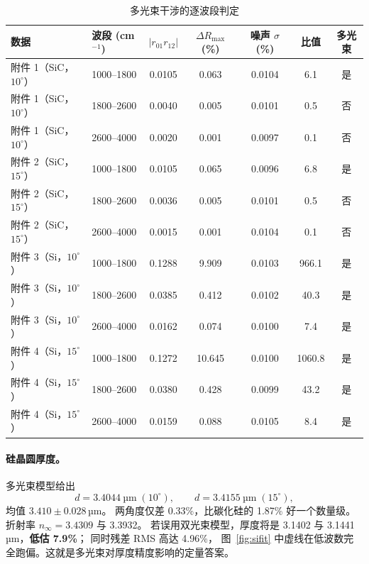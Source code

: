 \documentclass[12pt]{article}
\begin{document}
\begin{table}[!htbp]
  \centering
  \caption{多光束干涉的逐波段判定}\label{tab:diag}
  \begin{tabular}{llccccc}
    \toprule
    数据 & 波段 (cm$^{-1}$) & $|r_{01}r_{12}|$ & $\Delta R_{\max}$ (\%) & 噪声 $\sigma$ (\%) & 比值 & 多光束 \\
    \midrule
    附件 1（SiC，$10^\circ$） & 1000--1800 & 0.0105 & 0.063 & 0.0104 & 6.1 & 是 \\
    附件 1（SiC，$10^\circ$） & 1800--2600 & 0.0040 & 0.005 & 0.0101 & 0.5 & 否 \\
    附件 1（SiC，$10^\circ$） & 2600--4000 & 0.0020 & 0.001 & 0.0097 & 0.1 & 否 \\
    附件 2（SiC，$15^\circ$） & 1000--1800 & 0.0105 & 0.065 & 0.0096 & 6.8 & 是 \\
    附件 2（SiC，$15^\circ$） & 1800--2600 & 0.0036 & 0.005 & 0.0101 & 0.5 & 否 \\
    附件 2（SiC，$15^\circ$） & 2600--4000 & 0.0015 & 0.001 & 0.0104 & 0.1 & 否 \\
    附件 3（Si，$10^\circ$） & 1000--1800 & 0.1288 & 9.909 & 0.0103 & 966.1 & 是 \\
    附件 3（Si，$10^\circ$） & 1800--2600 & 0.0385 & 0.412 & 0.0102 & 40.3 & 是 \\
    附件 3（Si，$10^\circ$） & 2600--4000 & 0.0162 & 0.074 & 0.0100 & 7.4 & 是 \\
    附件 4（Si，$15^\circ$） & 1000--1800 & 0.1272 & 10.645 & 0.0100 & 1060.8 & 是 \\
    附件 4（Si，$15^\circ$） & 1800--2600 & 0.0380 & 0.428 & 0.0099 & 43.2 & 是 \\
    附件 4（Si，$15^\circ$） & 2600--4000 & 0.0159 & 0.088 & 0.0105 & 8.4 & 是 \\
    \bottomrule
  \end{tabular}
\end{table}

\paragraph{硅晶圆厚度。}
多光束模型给出
\[ d=3.4044\ \text{µm}\;(10^\circ),\qquad
   d=3.4155\ \text{µm}\;(15^\circ), \]
均值 $\mathbf{3.410\pm0.028}$\,µm。
两角度仅差 0.33\%，比碳化硅的 1.87\% 好一个数量级。
折射率 $n_\infty=3.4309$ 与 3.3932。
若误用双光束模型，厚度将是 3.1402 与
3.1441\,µm，\textbf{低估 7.9\%}；
同时残差 RMS 高达 4.96\%，
图~\ref{fig:sifit} 中虚线在低波数完全跑偏。这就是多光束对厚度精度影响的定量答案。
\end{document}
